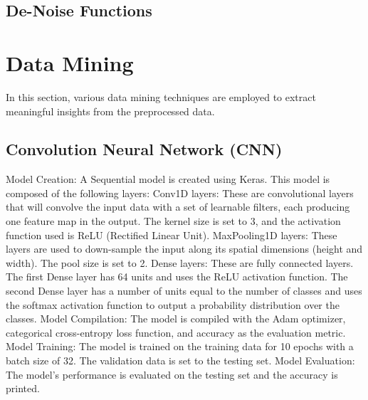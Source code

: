 \documentclass[
	article, %
	11pt, %
]{CSUniSchoolLabReport}
\begin{document}
\subsection{De-Noise Functions}\label{de_noise_Functions}


\section{Data Mining}\label{data_mining}

In this section, various data mining techniques are employed to extract meaningful insights from the preprocessed data.


\subsection{Convolution Neural Network (CNN)}\label{cnn} 

Model Creation: A Sequential model is created using Keras. This model is composed of the following layers: 
Conv1D layers: These are convolutional layers that will convolve the input data with a set of learnable filters, each producing one feature map in the output. The kernel size is set to 3, and the activation function used is ReLU (Rectified Linear Unit).  
MaxPooling1D layers: These layers are used to down-sample the input along its spatial dimensions (height and width). The pool size is set to 2.  
Dense layers: These are fully connected layers. The first Dense layer has 64 units and uses the ReLU activation function. The second Dense layer has a number of units equal to the number of classes and uses the softmax activation function to output a probability distribution over the classes.  
Model Compilation: The model is compiled with the Adam optimizer, categorical cross-entropy loss function, and accuracy as the evaluation metric.  
Model Training: The model is trained on the training data for 10 epochs with a batch size of 32. The validation data is set to the testing set.  
Model Evaluation: The model's performance is evaluated on the testing set and the accuracy is printed.  
\end{document}
